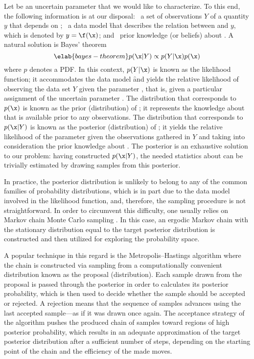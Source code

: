 Let \x be an uncertain parameter that we would like to characterize. To this
end, the following information is at our disposal: \one~a set of observations
$Y$ of a quantity $y$ that depends on \x; \two~a data model \f that describes
the relation between \x and $y$, which is denoted by $y = \f(\x)$; and
\three~prior knowledge (or beliefs) about \x. A natural solution is Bayes'
theorem \cite{gelman2013}
\begin{equation} \elab{bayes-theorem}
  p(\x | Y) \propto p(Y | \x) p(\x)
\end{equation}
where $p$ denotes a \ac{PDF}. In this context, $p(Y | \x)$ is known as the
likelihood function; it accommodates the data model \f and yields the relative
likelihood of observing the data set $Y$ given the parameter \x, that is, given
a particular assignment of the uncertain parameter \x. The distribution that
corresponds to $p(\x)$ is known as the prior (distribution) of \x; it represents
the knowledge about \x that is available prior to any observations. The
distribution that corresponds to $p(\x | Y)$ is known as the posterior
(distribution) of \x; it yields the relative likelihood of the parameter \x
given the observations gathered in $Y$ and taking into consideration the prior
knowledge about \x. The posterior is an exhaustive solution to our problem:
having constructed $p(\x | Y)$, the needed statistics about \x can be trivially
estimated by drawing samples from this posterior.

In practice, the posterior distribution is unlikely to belong to any of the
common families of probability distributions, which is in part due to the data
model involved in the likelihood function, and, therefore, the sampling
procedure is not straightforward. In order to circumvent this difficulty, one
usually relies on Markov chain Monte Carlo sampling \cite{gelman2013}. In this
case, an ergodic Markov chain with the stationary distribution equal to the
target posterior distribution is constructed and then utilized for exploring the
probability space.

A popular technique in this regard is the Metropolis--Hastings algorithm
\cite{gelman2013} where the chain is constructed via sampling from a
computationally convenient distribution known as the proposal (distribution).
Each sample drawn from the proposal is passed through the posterior in order to
calculates its posterior probability, which is then used to decide whether the
sample should be accepted or rejected. A rejection means that the sequence of
samples advances using the last accepted sample---as if it was drawn once again.
The acceptance strategy of the algorithm pushes the produced chain of samples
toward regions of high posterior probability, which results in an adequate
approximation of the target posterior distribution after a sufficient number of
steps, depending on the starting point of the chain and the efficiency of the
made moves.
